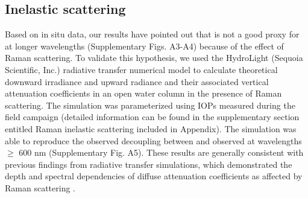 \subsection{Inelastic scattering}

Based on in situ data, our results have pointed out that \klu{} is not a good proxy for \ked{} at longer wavelengths (Supplementary Figs. A3-A4) because of the effect of Raman scattering. To validate this hypothesis, we used the HydroLight (Sequoia Scientific, Inc.) radiative transfer numerical model to calculate theoretical downward irradiance and upward radiance and their associated vertical attenuation coefficients in an open water column in the presence of Raman scattering. The simulation was parameterized using IOPs measured during the field campaign (detailed information can be found in the supplementary section entitled Raman inelastic scattering included in Appendix). The simulation was able to reproduce the observed decoupling between \ked{} and \klu{} observed at wavelengths $\ge$ 600 nm (Supplementary Fig. A5). These results are generally consistent with previous findings from radiative transfer simulations, which demonstrated the depth and spectral dependencies of diffuse attenuation coefficients as affected by Raman scattering \citep{Li2016, Berwald1998}.

